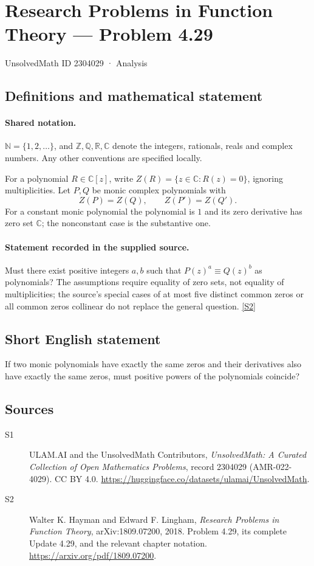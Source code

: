 \documentclass[11pt]{book}
\newcommand{\sref}[2]{\hyperlink{source:#1:#2}{[S#2]}}
\begin{document}
\setcounter{section}{2304028}
\section{Research Problems in Function Theory — Problem 4.29}\label{2304029}
{\small\sffamily UnsolvedMath ID 2304029 · Analysis}
\subsection{Definitions and mathematical statement}

\paragraph{Shared notation.}$\mathbb N=\{1,2,\ldots\}$, and $\mathbb Z,\mathbb Q,\mathbb R,\mathbb C$ denote the integers, rationals, reals and complex numbers. Any other conventions are specified locally.


For a polynomial $R\in\mathbb C[z]$, write $Z(R)=\{z\in\mathbb C:R(z)=0\}$, ignoring multiplicities. Let $P,Q$ be monic complex polynomials with
\[Z(P)=Z(Q),\qquad Z(P')=Z(Q').
\]
For a constant monic polynomial the polynomial is $1$ and its zero derivative has zero set $\mathbb C$; the nonconstant case is the substantive one.
\paragraph{Statement recorded in the supplied source.}
Must there exist positive integers $a,b$ such that $P(z)^a\equiv Q(z)^b$ as polynomials? The assumptions require equality of zero sets, not equality of multiplicities; the source's special cases of at most five distinct common zeros or all common zeros collinear do not replace the general question. \sref{2304029}{2}
\subsection{Short English statement}
If two monic polynomials have exactly the same zeros and their derivatives also have exactly the same zeros, must positive powers of the polynomials coincide?
\subsection{Sources}
\begin{description}
\item[\hypertarget{source:2304029:1}{S1}] ULAM.AI and the UnsolvedMath Contributors, \emph{UnsolvedMath: A Curated Collection of Open Mathematics Problems}, record 2304029 (AMR-022-4029). CC BY 4.0. \url{https://huggingface.co/datasets/ulamai/UnsolvedMath}.
\item[\hypertarget{source:2304029:2}{S2}] Walter K. Hayman and Edward F. Lingham, \emph{Research Problems in Function Theory}, arXiv:1809.07200, 2018. Problem 4.29, its complete Update 4.29, and the relevant chapter notation. \url{https://arxiv.org/pdf/1809.07200}.
\end{description}
\label{end:2304029}
\end{document}
